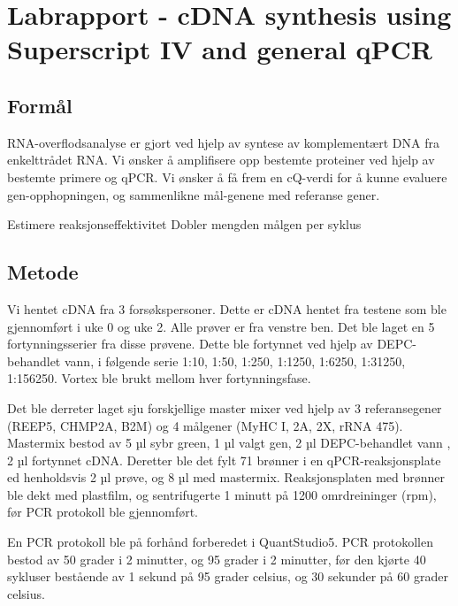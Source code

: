 \documentclass[
]{book}
\begin{document}
\hypertarget{labrapport---cdna-synthesis-using-superscript-iv-and-general-qpcr}{%
\chapter{Labrapport - cDNA synthesis using Superscript IV and general qPCR}\label{labrapport---cdna-synthesis-using-superscript-iv-and-general-qpcr}}

\hypertarget{formuxe5l}{%
\section{Formål}\label{formuxe5l}}

RNA-overflodsanalyse er gjort ved hjelp av syntese av komplementært DNA fra enkelttrådet RNA. Vi ønsker å amplifisere opp bestemte proteiner ved hjelp av bestemte primere og qPCR. Vi ønsker å få frem en cQ-verdi for å kunne evaluere gen-opphopningen, og sammenlikne mål-genene med referanse gener.

Estimere reaksjonseffektivitet Dobler mengden målgen per syklus

\hypertarget{metode-1}{%
\section{Metode}\label{metode-1}}

Vi hentet cDNA fra 3 forsøkspersoner. Dette er cDNA hentet fra testene som ble gjennomført i uke 0 og uke 2. Alle prøver er fra venstre ben. Det ble laget en 5 fortynningsserier fra disse prøvene. Dette ble fortynnet ved hjelp av DEPC-behandlet vann, i følgende serie 1:10, 1:50, 1:250, 1:1250, 1:6250, 1:31250, 1:156250. Vortex ble brukt mellom hver fortynningsfase.

Det ble derreter laget sju forskjellige master mixer ved hjelp av 3 referansegener (REEP5, CHMP2A, B2M) og 4 målgener (MyHC I, 2A, 2X, rRNA 475). Mastermix bestod av 5 µl sybr green, 1 µl valgt gen, 2 µl DEPC-behandlet vann , 2 µl fortynnet cDNA. Deretter ble det fylt 71 brønner i en qPCR-reaksjonsplate ed henholdsvis 2 µl prøve, og 8 µl med mastermix. Reaksjonsplaten med brønner ble dekt med plastfilm, og sentrifugerte 1 minutt på 1200 omrdreininger (rpm), før PCR protokoll ble gjennomført.

En PCR protokoll ble på forhånd forberedet i QuantStudio5. PCR protokollen bestod av 50 grader i 2 minutter, og 95 grader i 2 minutter, før den kjørte 40 sykluser bestående av 1 sekund på 95 grader celsius, og 30 sekunder på 60 grader celsius.
\end{document}
